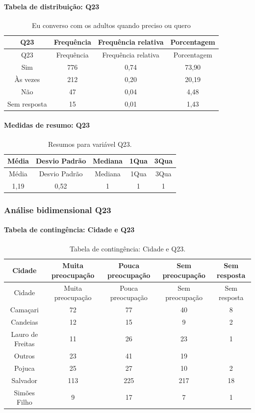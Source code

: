 \documentclass[]{article}
\let\oldparagraph\paragraph
\renewcommand{\paragraph}[1]{\oldparagraph{#1}\mbox{}}
\begin{document}
\hypertarget{tabela-de-distribuiuxe7uxe3o-q23}{%
\paragraph{Tabela de distribuição: Q23}\label{tabela-de-distribuiuxe7uxe3o-q23}}

\begin{longtable}[]{@{}cccc@{}}
\caption{\label{tab:unnamed-chunk-542}Eu converso com os adultos quando preciso ou quero}\tabularnewline
\toprule
Q23 & Frequência & Frequência relativa & Porcentagem\tabularnewline
\midrule
\endfirsthead
\toprule
Q23 & Frequência & Frequência relativa & Porcentagem\tabularnewline
\midrule
\endhead
Sim & 776 & 0,74 & 73,90\tabularnewline
Às vezes & 212 & 0,20 & 20,19\tabularnewline
Não & 47 & 0,04 & 4,48\tabularnewline
Sem resposta & 15 & 0,01 & 1,43\tabularnewline
\bottomrule
\end{longtable}

\hypertarget{medidas-de-resumo-q23}{%
\paragraph{Medidas de resumo: Q23}\label{medidas-de-resumo-q23}}

\begin{longtable}[]{@{}ccccc@{}}
\caption{\label{tab:unnamed-chunk-543}Resumos para variável Q23.}\tabularnewline
\toprule
Média & Desvio Padrão & Mediana & 1Qua & 3Qua\tabularnewline
\midrule
\endfirsthead
\toprule
Média & Desvio Padrão & Mediana & 1Qua & 3Qua\tabularnewline
\midrule
\endhead
1,19 & 0,52 & 1 & 1 & 1\tabularnewline
\bottomrule
\end{longtable}

\cleardoublepage

\hypertarget{anuxe1lise-bidimensional-q23}{%
\subsubsection{Análise bidimensional Q23}\label{anuxe1lise-bidimensional-q23}}

\hypertarget{tabela-de-continguxeancia-cidade-e-q23}{%
\paragraph{Tabela de contingência: Cidade e Q23}\label{tabela-de-continguxeancia-cidade-e-q23}}

\begin{longtable}[]{@{}ccccc@{}}
\caption{\label{tab:unnamed-chunk-544}Tabela de contingência: Cidade e Q23.}\tabularnewline
\toprule
Cidade & Muita preocupação & Pouca preocupação & Sem preocupação & Sem resposta\tabularnewline
\midrule
\endfirsthead
\toprule
Cidade & Muita preocupação & Pouca preocupação & Sem preocupação & Sem resposta\tabularnewline
\midrule
\endhead
Camaçari & 72 & 77 & 40 & 8\tabularnewline
Candeias & 12 & 15 & 9 & 2\tabularnewline
Lauro de Freitas & 11 & 26 & 23 & 1\tabularnewline
Outros & 23 & 41 & 19 &\tabularnewline
Pojuca & 25 & 27 & 10 & 2\tabularnewline
Salvador & 113 & 225 & 217 & 18\tabularnewline
Simões Filho & 9 & 17 & 7 & 1\tabularnewline
\bottomrule
\end{longtable}
\end{document}
